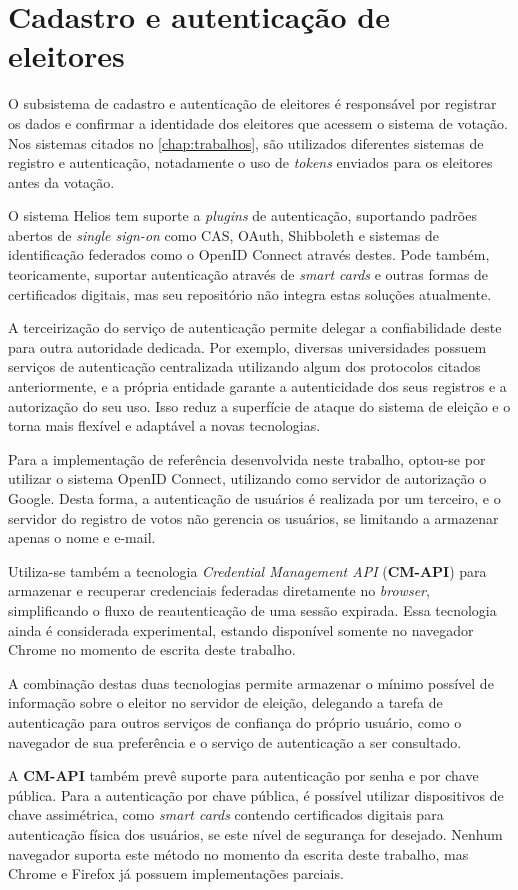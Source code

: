 \section{Cadastro e autenticação de eleitores}

O subsistema de cadastro e autenticação de eleitores é responsável por
registrar os dados e confirmar a identidade dos eleitores que acessem o sistema
de votação. Nos sistemas citados no \autoref{chap:trabalhos}, são utilizados
diferentes sistemas de registro e autenticação, notadamente o uso de
\textit{tokens} enviados para os eleitores antes da votação.

O sistema Helios tem suporte a \textit{plugins} de autenticação, suportando
padrões abertos de \textit{single sign-on} como CAS, OAuth, Shibboleth e
sistemas de identificação federados como o OpenID Connect através destes. Pode
também, teoricamente, suportar autenticação através de \textit{smart cards} e
outras formas de certificados digitais, mas seu repositório não integra estas
soluções atualmente.

A terceirização do serviço de autenticação permite delegar a confiabilidade
deste para outra autoridade dedicada. Por exemplo, diversas universidades
possuem serviços de autenticação centralizada utilizando algum dos protocolos
citados anteriormente, e a própria entidade garante a autenticidade dos seus
registros e a autorização do seu uso. Isso reduz a superfície de ataque do
sistema de eleição e o torna mais flexível e adaptável a novas tecnologias.

Para a implementação de referência desenvolvida neste trabalho, optou-se por
utilizar o sistema OpenID Connect, utilizando como servidor de autorização o
Google. Desta forma, a autenticação de usuários é realizada por um terceiro, e
o servidor do registro de votos não gerencia os usuários, se limitando a
armazenar apenas o nome e e-mail.

Utiliza-se também a tecnologia \textit{Credential Management API}
(\textbf{CM-API}) para armazenar e recuperar credenciais federadas diretamente
no \textit{browser}, simplificando o fluxo de reautenticação de uma sessão
expirada. Essa tecnologia ainda é considerada experimental, estando disponível
somente no navegador Chrome no momento de escrita deste trabalho.

A combinação destas duas tecnologias permite armazenar o mínimo possível de
informação sobre o eleitor no servidor de eleição, delegando a tarefa de
autenticação para outros serviços de confiança do próprio usuário, como o
navegador de sua preferência e o serviço de autenticação a ser consultado.

A \textbf{CM-API} também prevê suporte para autenticação por senha e por chave
pública. Para a autenticação por chave pública, é possível utilizar
dispositivos de chave assimétrica, como \textit{smart cards} contendo
certificados digitais para autenticação física dos usuários, se este nível de
segurança for desejado. Nenhum navegador suporta este método no momento da
escrita deste trabalho, mas Chrome e Firefox já possuem implementações
parciais.
